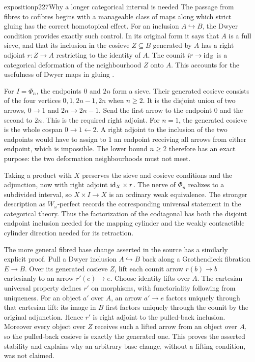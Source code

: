 \begin{dcomment}{exposition}{p227}{Why a longer categorical interval is needed}
The passage from fibres to cofibres begins with a manageable class of maps along which strict gluing has the correct homotopical effect. For an inclusion $A\hookrightarrow B$, the Dwyer condition provides exactly such control. In its original form it says that $A$ is a full sieve, and that its inclusion in the cosieve $Z\subseteq B$ generated by $A$ has a right adjoint $r:Z\to A$ restricting to the identity of $A$. The counit $ir\to\mathrm{id}_Z$ is a categorical deformation of the neighbourhood $Z$ onto $A$. This accounts for the usefulness of Dwyer maps in gluing \citep[Definition 4.1 and Proposition 4.3]{Thomason1980}.

For $I=\Phi_n$, the endpoints $0$ and $2n$ form a sieve. Their generated cosieve consists of the four vertices $0,1,2n-1,2n$ when $n\geq2$. It is the disjoint union of two arrows, $0\to1$ and $2n\to2n-1$. Send the first arrow to the endpoint $0$ and the second to $2n$. This is the required right adjoint. For $n=1$, the generated cosieve is the whole cospan $0\to1\leftarrow2$. A right adjoint to the inclusion of the two endpoints would have to assign to $1$ an endpoint receiving all arrows from either endpoint, which is impossible. The lower bound $n\geq2$ therefore has an exact purpose: the two deformation neighbourhoods must not meet.

Taking a product with $X$ preserves the sieve and cosieve conditions and the adjunction, now with right adjoint $\mathrm{id}_X\times r$. The nerve of $\Phi_n$ realizes to a subdivided interval, so $X\times I\to X$ is an ordinary weak equivalence. The stronger description as $W_\omega$-perfect records the corresponding universal statement in the categorical theory. Thus the factorization of the codiagonal has both the disjoint endpoint inclusion needed for the mapping cylinder and the weakly contractible cylinder direction needed for its retraction.

The more general fibred base change asserted in the source has a similarly explicit proof. Pull a Dwyer inclusion $A\hookrightarrow B$ back along a Grothendieck fibration $E\to B$. Over its generated cosieve $Z$, lift each counit arrow $r(b)\to b$ cartesianly to an arrow $r'(e)\to e$. Choose identity lifts over $A$. The cartesian universal property defines $r'$ on morphisms, with functoriality following from uniqueness. For an object $a'$ over $A$, an arrow $a'\to e$ factors uniquely through that cartesian lift: its image in $B$ first factors uniquely through the counit by the original adjunction. Hence $r'$ is right adjoint to the pulled-back inclusion. Moreover every object over $Z$ receives such a lifted arrow from an object over $A$, so the pulled-back cosieve is exactly the generated one. This proves the asserted stability and explains why an arbitrary base change, without a lifting condition, was not claimed.


\end{dcomment}
